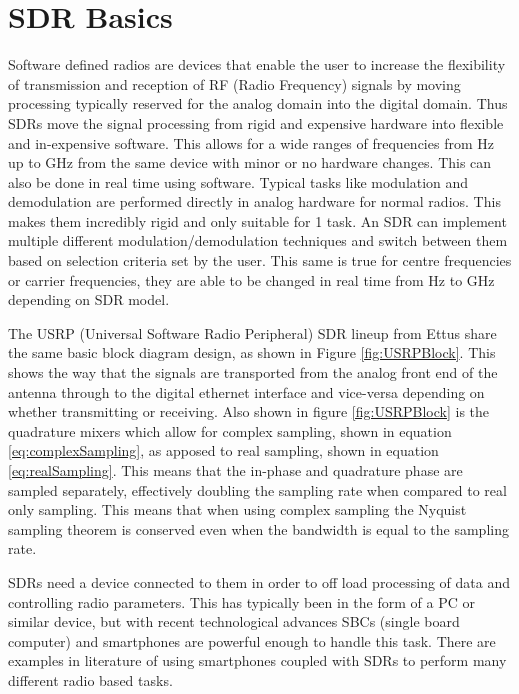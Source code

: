 
\section{SDR Basics} \label{sec:SDRBasics}
Software defined radios are devices that enable the user to increase the flexibility of transmission and reception of RF (Radio Frequency) signals by moving processing typically reserved
for the analog domain into the digital domain. Thus SDRs move the signal processing from rigid and expensive hardware into flexible and in-expensive software. This
allows for a wide ranges of frequencies from Hz up to GHz from the same device with minor or no hardware changes. This can also be done in real time using software.
Typical tasks like modulation and demodulation are performed directly in analog hardware for normal radios. This makes them incredibly rigid and only suitable for 1 task.
An SDR can implement multiple different modulation/demodulation techniques and switch between them based on selection criteria set by the user. This same is true for
centre frequencies or carrier frequencies, they are able to be changed in real time from Hz to GHz depending on SDR model.

\bigskip

The USRP (Universal Software Radio Peripheral) SDR lineup from Ettus share the same basic block diagram design, as shown in Figure \ref{fig:USRPBlock}. This shows the way that the signals are transported from the analog
front end of the antenna through to the digital ethernet interface and vice-versa depending on whether transmitting or receiving. Also shown in figure \ref{fig:USRPBlock} is the
quadrature mixers which allow for complex sampling, shown in equation \ref{eq:complexSampling}, as apposed to real sampling, shown in equation \ref{eq:realSampling}. This means that the in-phase and quadrature phase are sampled separately, effectively
doubling the sampling rate when compared to real only sampling. This means that when using complex sampling the Nyquist sampling theorem is conserved even when the
bandwidth is equal to the sampling rate.

\bigskip

SDRs need a device connected to them in order to off load processing of data and controlling radio parameters. This has typically been in the form of a PC or similar
device, but with recent technological advances SBCs (single board computer) and smartphones are powerful enough to handle this task. There are examples in literature of
using smartphones coupled with SDRs to perform many different radio based tasks.

